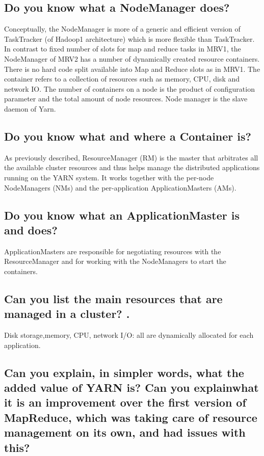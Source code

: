 \documentclass{article}
\begin{document}
\subsection{Do you know what a NodeManager does?}
Conceptually, the NodeManager is more of a generic and efficient version of TaskTracker (of Hadoop1 architecture) which is more flexible than TaskTracker. In contrast to fixed number of slots for map and reduce tasks in MRV1, the NodeManager of MRV2 has a number of dynamically created resource containers. There is no hard code split available into Map and Reduce slots as in MRV1. The container refers to a collection of resources such as memory, CPU, disk and network IO. The number of containers on a node is the product of configuration parameter and the total amount of node resources. Node manager is the slave daemon of Yarn.

\subsection{Do you know what and where a Container is?}
As previously described, ResourceManager (RM) is the master that arbitrates all the available cluster resources and thus helps manage the distributed applications running on the YARN system. It works together with the per-node NodeManagers (NMs) and the per-application ApplicationMasters (AMs).

\subsection{Do you know what an ApplicationMaster is and does?}
ApplicationMasters are responsible for negotiating resources with the ResourceManager and for working with the NodeManagers to start the containers.

\subsection{Can you list the main resources that are managed in a cluster? .}
Disk storage,memory, CPU, network I/O: all are dynamically allocated for each application.

\subsection{Can you explain, in simpler words, what the added value of YARN is? Can you explainwhat it is an improvement over the first version of MapReduce, which was taking care of resource management on its own, and had issues with this?}
\end{document}
